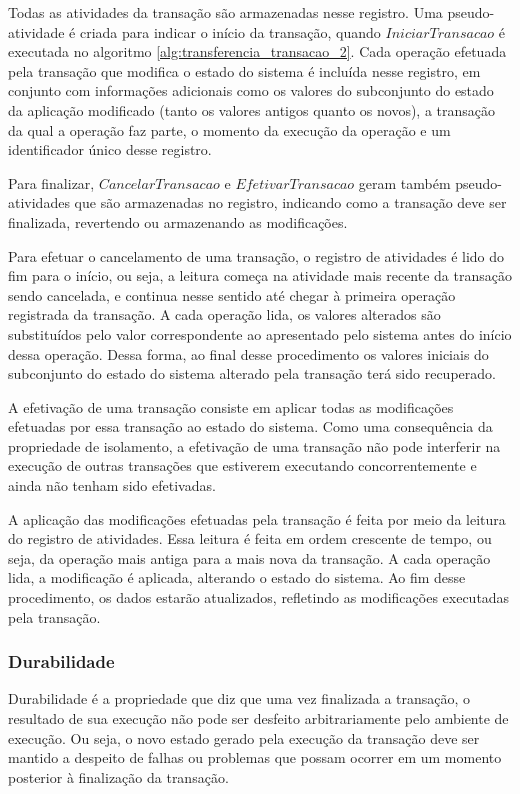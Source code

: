 \documentclass[11pt,twoside,a4paper]{book}
\begin{document}
Todas as atividades da transação são armazenadas nesse registro. Uma pseudo-atividade é criada para indicar o início da transação, quando $IniciarTransacao$ é executada no algoritmo \ref{alg:transferencia_transacao_2}. Cada operação efetuada pela transação que modifica o estado do sistema é incluída nesse registro, em conjunto com informações adicionais como os valores do subconjunto do estado da aplicação modificado (tanto os valores antigos quanto os novos), a transação da qual a operação faz parte, o momento da execução da operação e um identificador único desse registro. 

Para finalizar, $CancelarTransacao$ e $EfetivarTransacao$ geram também pseudo-atividades que são armazenadas no registro, indicando como a transação deve ser finalizada, revertendo ou armazenando as modificações. 

Para efetuar o cancelamento de uma transação, o registro de atividades é lido do fim para o início, ou seja, a leitura começa na atividade mais recente da transação sendo cancelada, e continua nesse sentido até chegar à primeira operação registrada da transação. A cada operação lida, os valores alterados são substituídos pelo valor correspondente ao apresentado pelo sistema antes do início dessa operação. Dessa forma, ao final desse procedimento os valores iniciais do subconjunto do estado do sistema alterado pela transação terá sido recuperado.

A efetivação de uma transação consiste em aplicar todas as modificações efetuadas por essa transação ao estado do sistema. Como uma consequência da propriedade de isolamento, a efetivação de uma transação não pode interferir na execução de outras transações que estiverem executando concorrentemente e ainda não tenham sido efetivadas.

A aplicação das modificações efetuadas pela transação é feita por meio da leitura do registro de atividades. Essa leitura é feita em ordem crescente de tempo, ou seja, da operação mais antiga para a mais nova da transação. A cada operação lida, a modificação é aplicada, alterando o estado do sistema. Ao fim desse procedimento, os dados estarão atualizados, refletindo as modificações executadas pela transação.

\subsubsection*{Durabilidade}
Durabilidade é a propriedade que diz que uma vez finalizada a transação, o resultado de sua execução não pode ser desfeito arbitrariamente pelo ambiente de execução. Ou seja, o novo estado gerado pela execução da transação deve ser mantido a despeito de falhas ou problemas que possam ocorrer em um momento posterior à finalização da transação.
\end{document}
